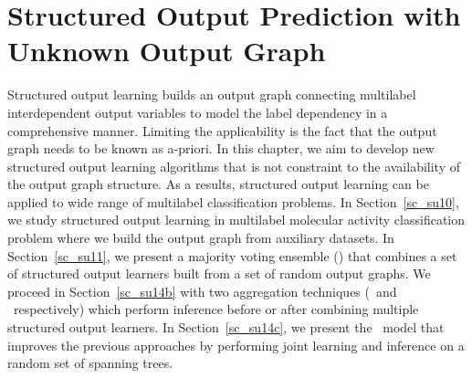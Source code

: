 {











%
\chapter{Structured Output Prediction with Unknown Output Graph} \label{ch_sopw}

Structured output learning builds an output graph connecting multilabel interdependent output variables to model the label dependency in a comprehensive manner. 
Limiting the applicability is the fact that the output graph needs to be known as a-priori.
In this chapter, we aim to develop new structured output learning algorithms that is not constraint to the availability of the output graph structure.
As a results, structured output learning can be applied to wide range of multilabel classification problems.
In Section~\ref{sc_su10}, we study structured output learning in multilabel molecular activity classification problem where we build the output graph from auxiliary datasets.
In Section~\ref{sc_su11}, we present a majority voting ensemble (\mve) that combines a set of structured output learners built from a set of random output graphs.
We proceed in Section~\ref{sc_su14b} with two aggregation techniques (\amm\ and \mam\ respectively) which perform inference before or after combining multiple structured output learners.
In Section~\ref{sc_su14c}, we present the \rta\ model that improves the previous approaches by performing joint learning and inference on a random set of spanning trees.



}
